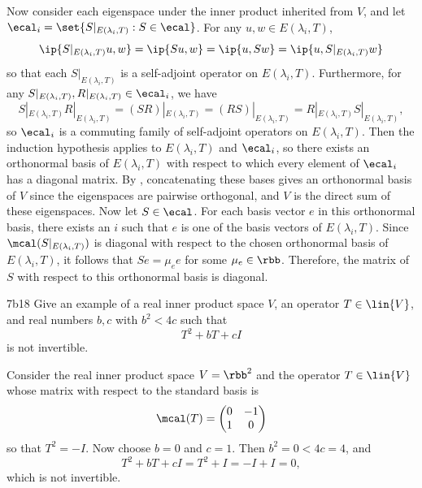 \begin{soliff}
    Now consider each eigenspace under the inner product inherited from $V$, and let $\ecal_i = \set{S|_{E(\lambda_i, T)} : S \in \ecal}$.
    For any $u, w \in E(\lambda_i, T)$,
    \[
        \ip{S|_{E(\lambda_i, T)} u, w} = \ip{Su, w} = \ip{u, Sw} = \ip{u, S|_{E(\lambda_i, T)} w}
    \]
    so that each $S|_{E(\lambda_i, T)}$ is a self-adjoint operator on $E(\lambda_i, T)$.
    Furthermore, for any $S|_{E(\lambda_i, T)}, R|_{E(\lambda_i, T)} \in \ecal_i$, we have
    \[
        S|_{E(\lambda_i, T)} R|_{E(\lambda_i, T)} = (SR)|_{E(\lambda_i, T)} = (RS)|_{E(\lambda_i, T)} = R|_{E(\lambda_i, T)} S|_{E(\lambda_i, T)},
    \]
    so $\ecal_i$ is a commuting family of self-adjoint operators on $E(\lambda_i, T)$.
    Then the induction hypothesis applies to $E(\lambda_i, T)$ and $\ecal_i$, so there exists an orthonormal basis of $E(\lambda_i, T)$ with respect to which every element of $\ecal_i$ has a diagonal matrix.
    By , concatenating these bases gives an orthonormal basis of $V$ since the eigenspaces are pairwise orthogonal, and $V$ is the direct sum of these eigenspaces.
    Now let $S \in \ecal$.
    For each basis vector $e$ in this orthonormal basis, there exists an $i$ such that $e$ is one of the basis vectors of $E(\lambda_i, T)$.
    Since $\mcal(S|_{E(\lambda_i, T)})$ is diagonal with respect to the chosen orthonormal basis of $E(\lambda_i, T)$, it follows that $S e = \mu_e e$ for some $\mu_e \in \rbb$.
    Therefore, the matrix of $S$ with respect to this orthonormal basis is diagonal.
\end{soliff}

\begin{exercise}{7b18}
    Give an example of a real inner product space $V$, an operator $T \in \lin{V}$, and real numbers $b, c$ with $b^2 < 4c$ such that
    \[
        T^2 + bT + cI
    \]
    is not invertible.
    
\end{exercise}

\begin{sol}
    Consider the real inner product space $V = \rbb^2$ and the operator $T \in \lin{V}$ whose matrix with respect to the standard basis is
    \[
        \mcal(T) = 
        \begin{pmatrix}
            0 & -1 \\
            1 & 0
        \end{pmatrix}
    \]
    so that $T^2 = -I$.
    Now choose $b = 0$ and $c = 1$. Then $b^2 = 0 < 4c = 4$, and
    \[
        T^2 + bT + cI = T^2 + I = -I + I = 0,
    \]
    which is not invertible.
\end{sol}

